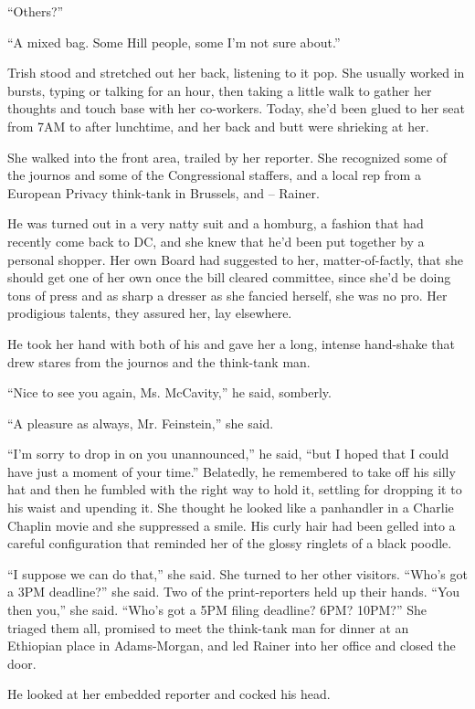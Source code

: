 “Others?”

“A mixed bag. Some Hill people, some I'm not sure about.”

Trish stood and stretched out her back, listening to it pop. She 
usually worked in bursts, typing or talking for an hour, then taking a 
little walk to gather her thoughts and touch base with her co-workers. 
Today, she'd been glued to her seat from 7AM to after lunchtime, and 
her back and butt were shrieking at her.

She walked into the front area, trailed by her reporter. She recognized 
some of the journos and some of the Congressional staffers, and a local 
rep from a European Privacy think-tank in Brussels, and -- Rainer.

He was turned out in a very natty suit and a homburg, a fashion that 
had recently come back to DC, and she knew that he'd been put together 
by a personal shopper. Her own Board had suggested to her, 
matter-of-factly, that she should get one of her own once the bill 
cleared committee, since she'd be doing tons of press and as sharp a 
dresser as she fancied herself, she was no pro. Her prodigious talents, 
they assured her, lay elsewhere.

He took her hand with both of his and gave her a long, intense 
hand-shake that drew stares from the journos and the think-tank man.

“Nice to see you again, Ms. McCavity,” he said, somberly.

“A pleasure as always, Mr. Feinstein,” she said.

“I'm sorry to drop in on you unannounced,” he said, “but I hoped 
that I could have just a moment of your time.” Belatedly, he 
remembered to take off his silly hat and then he fumbled with the right 
way to hold it, settling for dropping it to his waist and upending it. 
She thought he looked like a panhandler in a Charlie Chaplin movie and 
she suppressed a smile. His curly hair had been gelled into a careful 
configuration that reminded her of the glossy ringlets of a black 
poodle.

“I suppose we can do that,” she said. She turned to her other 
visitors. “Who's got a 3PM deadline?” she said. Two of the 
print-reporters held up their hands. “You then you,” she said. 
“Who's got a 5PM filing deadline? 6PM? 10PM?” She triaged them all, 
promised to meet the think-tank man for dinner at an Ethiopian place in 
Adams-Morgan, and led Rainer into her office and closed the door.

He looked at her embedded reporter and cocked his head.


